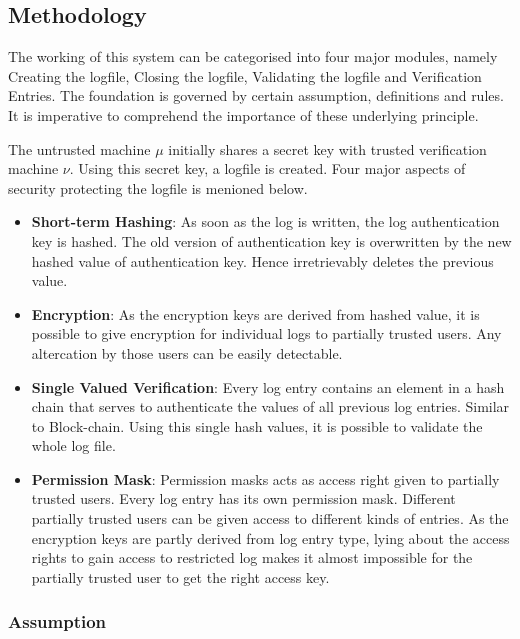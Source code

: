 \documentclass[12pt, letter]{article}
\begin{document}
\subsection{Methodology}

The working of this system can be categorised into four major modules, namely Creating the logfile, Closing the logfile, Validating the logfile and Verification Entries. The foundation is governed by certain assumption, definitions and rules. It is imperative to comprehend the importance of these underlying principle. 

The untrusted machine $\mu$ initially shares a secret key with trusted verification machine $\nu$. Using this secret key, a logfile is created. Four major aspects of security protecting the logfile is menioned below.

\begin{itemize}
    \item \textbf{Short-term Hashing}: As soon as the log is written, the log authentication key is hashed. The old version of authentication key is overwritten by the new hashed value of authentication key. Hence irretrievably deletes the previous value.
    
    \item \textbf{Encryption}: As the encryption keys are derived from hashed value, it is possible to give encryption for individual logs to partially trusted users. Any altercation by those users can be easily detectable.
    
    \item \textbf{Single Valued Verification}: Every log entry contains an element in a hash chain that serves to authenticate the values of all previous log entries. Similar to Block-chain. Using this single hash values, it is possible to validate the whole log file.
    
    \item \textbf{Permission Mask}: Permission masks acts as access right given to partially trusted users. Every log entry has its own permission mask. Different partially trusted users can be given access to different kinds of entries. As the encryption keys are partly derived from log entry type, lying about the access rights to gain access to restricted log makes it almost impossible for the partially trusted user to get the right access key.
    
\end{itemize}

\subsubsection{Assumption}
\end{document}
